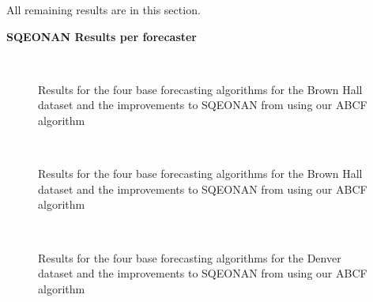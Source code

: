 \label{app:results}
All remaining results are in this section. 


\bigskip
\noindent \textbf{SQEONAN Results per forecaster} \\
\begin{figure}[!h]
	\begin{center}
		 \\
	\end{center}
	\caption{Results for the four base forecasting algorithms for the Brown Hall dataset and the improvements to SQEONAN from using our ABCF algorithm}
	\label{fig:sqe_merl_results}
\end{figure}

\begin{figure}[!t]
	\begin{center}
		 \\
	\end{center}
	\caption{Results for the four base forecasting algorithms for the Brown Hall dataset and the improvements to SQEONAN from using our ABCF algorithm}
	\label{fig:sqe_brown_results}
\end{figure}

\begin{figure}[!b]
	\begin{center}
		 \\
	\end{center}
	\caption{Results for the four base forecasting algorithms for the Denver dataset and the improvements to SQEONAN from using our ABCF algorithm}
	\label{fig:sqe_denver_results}
\end{figure}

